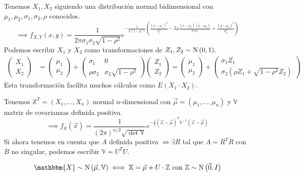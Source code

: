 Tenemos $X_1, X_2$ siguiendo una distribución normal bidimensional con $\mu_1, \mu_2, \sigma_1, \sigma_2, \rho$ conocidos.
\[\implies f_{X, Y}(x,y) = \frac{1}{2\pi \sigma_1 \sigma_2 \sqrt{1-\rho^2}} e^{-\frac{1}{2(1-\rho^2)}\left(\frac{(x-\mu_1)^2}{\sigma_1^2} - 2\rho \frac{(x-\mu_1)(y-\mu_2)}{\sigma_1 \sigma_2} + \frac{(y-\mu_2)^2}{\sigma_2^2}\right)}\]
Podemos escribir $X_1$ y $X_2$ como transformaciones de $Z_1, Z_2 \sim \operatorname{N}\left(0, 1\right)$.
\[\begin{aligned}
		\begin{pmatrix}
			X_1 \\
			X_2
		\end{pmatrix} & = \begin{pmatrix}
			                  \mu_1 \\
			                  \mu_2
		                  \end{pmatrix} + \begin{pmatrix}
			                                  \sigma_1      & 0                        \\
			                                  \rho \sigma_2 & \sigma_2 \sqrt{1-\rho^2}
		                                  \end{pmatrix} \begin{pmatrix}
			                                                Z_1 \\
			                                                Z_2
		                                                \end{pmatrix} = \begin{pmatrix}
			                                                                \mu_1 \\
			                                                                \mu_2
		                                                                \end{pmatrix} + \begin{pmatrix}
			                                                                                \sigma_1 Z_1 \\
			                                                                                \sigma_2 (\rho Z_1 + \sqrt{1-\rho^2} Z_2)
		                                                                                \end{pmatrix}
	\end{aligned}\]
Esta transformación facilita muchos cálculos como $E(X_1 \cdot X_2)$.

Tenemos $\mathbb{X}^T = (X_1, \dots, X_n)$ normal $n$-dimensional con $\vec{\mu} = (\mu_1, \dots, \mu_n)$ y $\mathbb{V}$ matriz de covarianzas definida positiva.
\[\implies f_{\mathbb{X}}(\vec{x}) = \frac{1}{(2\pi)^{n/2} \sqrt{\det{\mathbb{V}}}} e^{-\frac{1}{2} (\vec{x} - \vec{\mu})^T \mathbb{V}^{-1} (\vec{x} - \vec{\mu})}\]
Si ahora tenemos en cuenta que $A$ definida positiva $\iff \exists R$ tal que $A = R^T R$ con $B$ no singular, podemos escribir $\mathbb{V} = U^T U$.

\begin{teo}[de representación]
	\[\mathbbm{X} \sim \normal{\vec{\mu}, \mathbb{V}} \iff \mathbb{X} = \vec{\mu} + U\cdot \Z \tex{ con } \Z \sim \normal{\vec{0}, I}\]
\end{teo}
